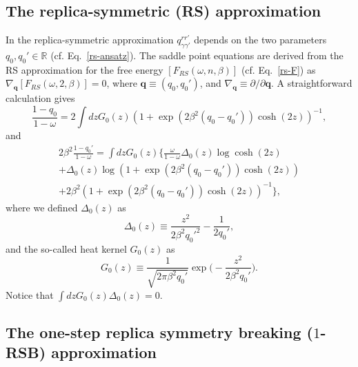 \documentclass[twocolumn,superscriptaddress,prb,10pt]{revtex4-1}
\begin{document}
\subsection{The replica-symmetric (RS) approximation}

In the replica-symmetric approximation $q_{\gamma\gamma'}^{rr'}$ depends on the two 
parameters $q_0,q_0'\in\mathbb{R}$ (cf. Eq.~\eqref{rs-ansatz}). The saddle point 
equations are derived from the RS approximation for the free energy $[F_{RS}
(\omega,n,\beta)]$ (cf. Eq.~\eqref{rs-F}) as $\nabla_{\mathbf{q}}[F_{RS}(\omega,2,
\beta)]=0$, where $\mathbf{q}\equiv(q_0,q_0')$, and $\nabla_{\mathbf{q}}\equiv
\partial/\partial\mathbf{q}$. A straightforward calculation gives 
%
\begin{equation}
\label{RS-saddle-1}
\frac{1-q_0}{1-\omega}=2\int dz G_0(z)(1+\exp(2\beta^2(q_0-q_0'))\cosh(2z))^{-1},
\end{equation}
%
and
%
\begin{multline}
\label{RS-saddle-2}
2\beta^2\frac{1-q_0'}{1-\omega}=
\int dz G_0(z)\Big\{\frac{\omega}{1-\omega}\Delta_0(z)
\log\cosh(2z)\\
+\Delta_0(z)\log(1+\exp(2\beta^2(q_0-q_0'))\cosh(2z))\\
+2\beta^2(1+\exp(2\beta^2(q_0-q_0'))\cosh(2z))^{-1}
\Big\},
\end{multline}
%
where we defined $\Delta_0(z)$ as 
%
\begin{equation}
\Delta_0(z)\equiv\frac{z^2}{2\beta^2q_0'^2}-\frac{1}{2q_0'},
\end{equation}
%
and the so-called heat kernel $G_0(z)$ as 
%
\begin{equation}
G_0(z)\equiv\frac{1}{\sqrt{2\pi \beta^2 q_0'}}\exp\Big(-\frac{z^2}
{2\beta^2 q_0'}\Big).
\end{equation}
%
Notice that $\int dz G_0(z)\Delta_0(z)=0$.

\subsection{The one-step replica symmetry breaking ($1$-RSB) approximation}
\end{document}
